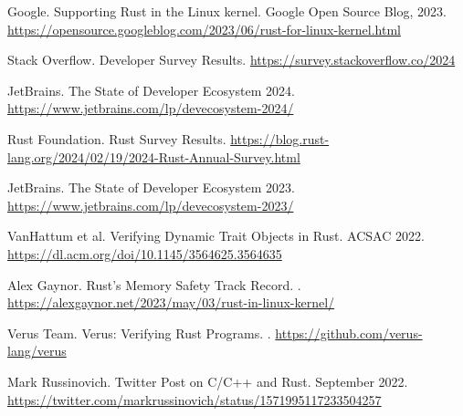 \documentclass[11pt]{article}
\begin{document}
\begin{thebibliography}{99}
Google.
\newblock Supporting Rust in the Linux kernel.
\newblock Google Open Source Blog, 2023.
\newblock \url{https://opensource.googleblog.com/2023/06/rust-for-linux-kernel.html}

Stack Overflow.
 Developer Survey Results.
\newblock \url{https://survey.stackoverflow.co/2024}

JetBrains.
\newblock The State of Developer Ecosystem 2024.
\newblock \url{https://www.jetbrains.com/lp/devecosystem-2024/}

Rust Foundation.
 Rust Survey Results.
\newblock \url{https://blog.rust-lang.org/2024/02/19/2024-Rust-Annual-Survey.html}

JetBrains.
\newblock The State of Developer Ecosystem 2023.
\newblock \url{https://www.jetbrains.com/lp/devecosystem-2023/}

VanHattum et al.
\newblock Verifying Dynamic Trait Objects in Rust.
\newblock ACSAC 2022.
\newblock \url{https://dl.acm.org/doi/10.1145/3564625.3564635}

Alex Gaynor.
\newblock Rust's Memory Safety Track Record.
.
\newblock \url{https://alexgaynor.net/2023/may/03/rust-in-linux-kernel/}

Verus Team.
\newblock Verus: Verifying Rust Programs.
.
\newblock \url{https://github.com/verus-lang/verus}

Mark Russinovich.
\newblock Twitter Post on C/C++ and Rust.
\newblock September 2022.
\newblock \url{https://twitter.com/markrussinovich/status/1571995117233504257}

\end{thebibliography}
\end{document}
